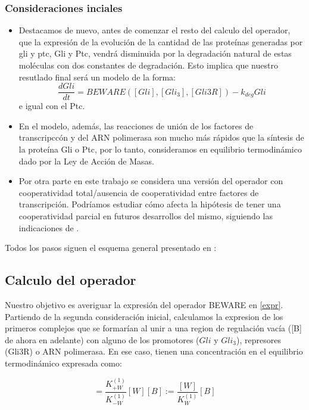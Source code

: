 \subsubsection{Consideraciones inciales}
\begin{itemize}

\item Destacamos de nuevo, antes de comenzar el resto del calculo del operador, que la expresión de la evolución de la cantidad de las proteínas generadas por gli y ptc, Gli y Ptc, vendrá disminuida por la degradación natural de estas moléculas con dos constantes de degradación. Esto implica que nuestro resutlado final será un modelo de la forma:
\begin{equation}
\frac{dGli}{dt}=BEWARE([Gli],[Gli_3],[Gli3R])-k_{deg}Gli
\label{expr}
\end{equation}
e igual con el Ptc.

\item En el modelo, además, las reacciones de unión de los factores de transcripccón y del ARN polimerasa son mucho más rápidos que la síntesis de la proteína Gli o Ptc, por lo tanto, consideramos en equilibrio termodinámico dado por la Ley de Acción de Masas.

\item Por otra parte en este trabajo se considera una versión del operador con cooperatividad total/ausencia de cooperatividad entre factores de transcripción. Podríamos estudiar cómo afecta la hipótesis de tener una cooperatividad parcial en futuros desarrollos del mismo, siguiendo las indicaciones de \cite{cambon1}.
	 
\end{itemize}
Todos los pasos siguen el esquema general presentado en \cite{cambon1}:
\subsection{Calculo del operador}
Nuestro objetivo es averiguar la expresión del operador BEWARE en \ref{expr}.
Partiendo de la segunda consideración inicial, calculamos la expresion de los primeros complejos que se formarían al unir a una region de regulación vacía ([B] de ahora en adelante) con alguno de los promotores ($Gli$ y $Gli_3$), represores (Gli3R) o ARN polimerasa. En ese caso, tienen una concentración en el equilibrio termodinámico expresada como:

\begin{equation}
[BW]=\frac{K^{(1)}_{+W}}{K^{(1)}_{-W}}[W][B]:=\frac{[W]}{K^{(1)}_W}[B]
\end{equation}

